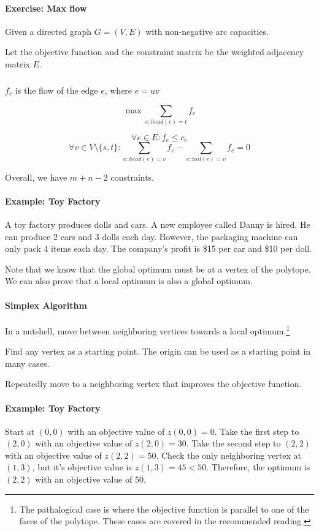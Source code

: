 \documentclass[a4paper]{article}
\newenvironment{enumerate*}%
  {\begin{enumerate}%
    \setlength{\itemsep}{0.5pt}%
    \setlength{\parsep}{0pt}%
    \setlength{\parskip}{0pt}}%
  {\end{enumerate}}
\begin{document}
\paragraph{Exercise: Max flow}
Given a directed graph $G=(V,E)$ with non-negative arc capacities.

Let the objective function and the constraint matrix be the weighted adjacency matrix $E$.

\subparagraph{}
$f_e$ is the flow of the edge $e$, where $e=uv$

\[\max \sum_{e:head(e)=t} f_e\]

\[\forall e\in E : f_e \le c_e \]
\[\forall v\in V \setminus \{s,t\} : \sum_{e:head(e)=v} f_e - \sum_{e:tail(e)=v} f_e = 0\]

Overall, we have $m+n-2$ constraints.

\paragraph{Example: Toy Factory}
A toy factory produces dolls and cars.
A new employee called Danny is hired.
He can produce 2 cars and 3 dolls each day.
However, the packaging machine can only pack 4 items each day.
The company's profit is \$15 per car and \$10 per doll.

Note that we know that the global optimum must be at a vertex of the polytope.
We can also prove that a local optimum is also a global optimum.

\paragraph{Simplex Algorithm}
In a nutshell, move between neighboring vertices towards a local optimum.\footnote{The pathalogical case is where the objective function is parallel to one of the faces of the polytope. These cases are covered in the recommended reading.}

\begin{enumerate*}
  \item Find any vertex as a starting point. The origin can be used as a starting point in many cases.
  \item Repeatedly move to a neighboring vertex that improves the objective function.
\end{enumerate*}

\paragraph{Example: Toy Factory}
Start at $(0,0)$ with an objective value of $z(0,0)=0$.
Take the first step to $(2,0)$ with an objective value of $z(2,0)=30$.
Take the second step to $(2,2)$ with an objective value of $z(2,2)=50$.
Check the only neighboring vertex at $(1,3)$, but it's objective value is $z(1,3)=45 < 50$.
Therefore, the optimum is $(2,2)$ with an objective value of $50$.
\end{document}
